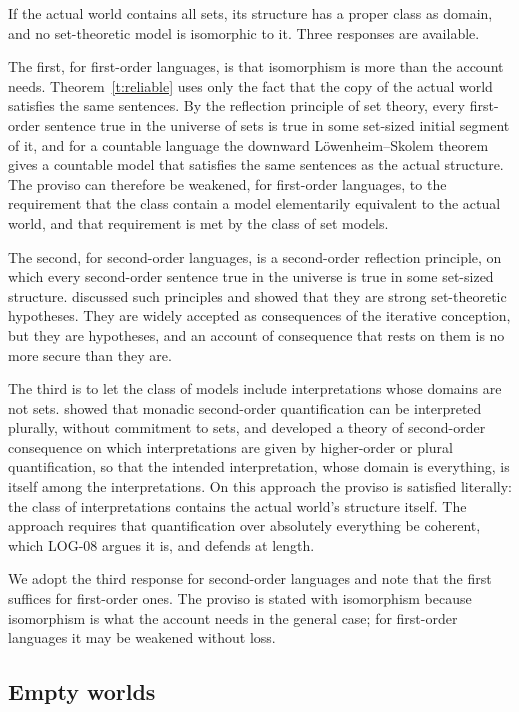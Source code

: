 \documentclass{situationist-preprint}
\begin{document}
If the actual world contains all sets, its structure has a proper class as domain, and no set-theoretic model is isomorphic to it. Three responses are available.

The first, for first-order languages, is that isomorphism is more than the account needs. Theorem~\ref{t:reliable} uses only the fact that the copy of the actual world satisfies the same sentences. By the reflection principle of set theory, every first-order sentence true in the universe of sets is true in some set-sized initial segment of it, and for a countable language the downward L\"owenheim--Skolem theorem gives a countable model that satisfies the same sentences as the actual structure. The proviso can therefore be weakened, for first-order languages, to the requirement that the class contain a model elementarily equivalent to the actual world, and that requirement is met by the class of set models.

The second, for second-order languages, is a second-order reflection principle, on which every second-order sentence true in the universe is true in some set-sized structure. \citet{Shapiro1987} discussed such principles and showed that they are strong set-theoretic hypotheses. They are widely accepted as consequences of the iterative conception, but they are hypotheses, and an account of consequence that rests on them is no more secure than they are.

The third is to let the class of models include interpretations whose domains are not sets. \citet{Boolos1984,Boolos1985} showed that monadic second-order quantification can be interpreted plurally, without commitment to sets, and \citet{RayoUzquiano1999} developed a theory of second-order consequence on which interpretations are given by higher-order or plural quantification, so that the intended interpretation, whose domain is everything, is itself among the interpretations. On this approach the proviso is satisfied literally: the class of interpretations contains the actual world's structure itself. The approach requires that quantification over absolutely everything be coherent, which LOG-08 argues it is, and \citet{Williamson2003} defends at length.

We adopt the third response for second-order languages and note that the first suffices for first-order ones. The proviso is stated with isomorphism because isomorphism is what the account needs in the general case; for first-order languages it may be weakened without loss.

\subsection{Empty worlds}
\end{document}
